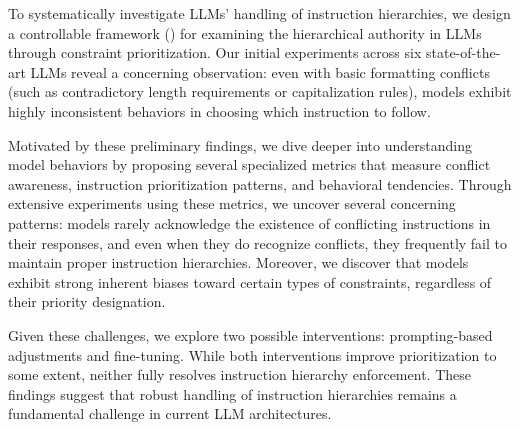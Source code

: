 To systematically investigate LLMs' handling of instruction hierarchies, we design a controllable framework () for examining the hierarchical authority in LLMs through constraint prioritization. Our initial experiments across six state-of-the-art LLMs reveal a concerning observation: even with basic formatting conflicts (such as contradictory length requirements or capitalization rules), models exhibit highly inconsistent behaviors in choosing which instruction to follow.

Motivated by these preliminary findings, we dive deeper into understanding model behaviors by proposing several specialized metrics that measure conflict awareness, instruction prioritization patterns, and behavioral tendencies. Through extensive experiments using these metrics, we uncover several concerning patterns: models rarely acknowledge the existence of conflicting instructions in their responses, and even when they do recognize conflicts, they frequently fail to maintain proper instruction hierarchies. Moreover, we discover that models exhibit strong inherent biases toward certain types of constraints, regardless of their priority designation.

Given these challenges, we explore two possible interventions: prompting-based adjustments and fine-tuning. While both interventions improve prioritization to some extent, neither fully resolves instruction hierarchy enforcement. These findings suggest that robust handling of instruction hierarchies remains a fundamental challenge in current LLM architectures.

